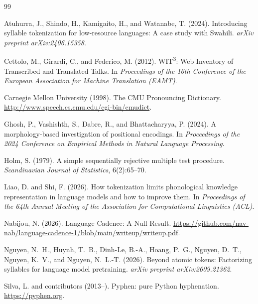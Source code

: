 \documentclass[11pt]{article}
\begin{document}
\begin{thebibliography}{99}

Atuhurra, J., Shindo, H., Kamigaito, H., and Watanabe, T. (2024).
\newblock Introducing syllable tokenization for low-resource languages: A case study with Swahili.
\newblock \emph{arXiv preprint arXiv:2406.15358}.

Cettolo, M., Girardi, C., and Federico, M. (2012).
\newblock WIT\textsuperscript{3}: Web Inventory of Transcribed and Translated Talks.
\newblock In \emph{Proceedings of the 16th Conference of the European Association for Machine Translation (EAMT)}.

Carnegie Mellon University (1998).
\newblock The CMU Pronouncing Dictionary.
\newblock \url{http://www.speech.cs.cmu.edu/cgi-bin/cmudict}.

Ghosh, P., Vashishth, S., Dabre, R., and Bhattacharyya, P. (2024).
\newblock A morphology-based investigation of positional encodings.
\newblock In \emph{Proceedings of the 2024 Conference on Empirical Methods in Natural Language Processing}.

Holm, S. (1979).
\newblock A simple sequentially rejective multiple test procedure.
\newblock \emph{Scandinavian Journal of Statistics}, 6(2):65--70.

Liao, D. and Shi, F. (2026).
\newblock How tokenization limits phonological knowledge representation in language models and how to improve them.
\newblock In \emph{Proceedings of the 64th Annual Meeting of the Association for Computational Linguistics (ACL)}.

Nabijou, N. (2026).
\newblock Language Cadence: A Null Result.
\newblock \url{https://github.com/nav-nab/language-cadence-1/blob/main/writeup/writeup.pdf}.

Nguyen, N.~H., Huynh, T.~B., Dinh-Le, B.-A., Hoang, P.~G., Nguyen, D.~T., Nguyen, K.~V., and Nguyen, N.~L.-T. (2026).
\newblock Beyond atomic tokens: Factorizing syllables for language model pretraining.
\newblock \emph{arXiv preprint arXiv:2609.21362}.

Silva, L. and contributors (2013--).
\newblock Pyphen: pure Python hyphenation.
\newblock \url{https://pyphen.org}.


\end{thebibliography}
\end{document}
